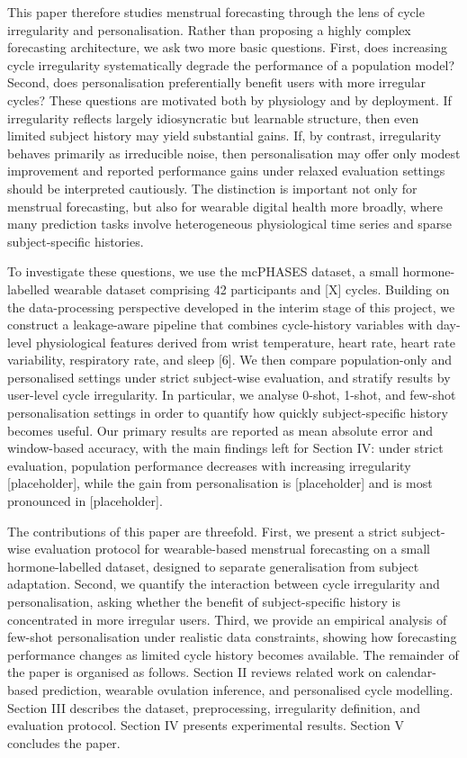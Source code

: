 \documentclass[conference]{IEEEtran}
\begin{document}
This paper therefore studies menstrual forecasting through the lens of cycle irregularity and personalisation. Rather than proposing a highly complex forecasting architecture, we ask two more basic questions. First, does increasing cycle irregularity systematically degrade the performance of a population model? Second, does personalisation preferentially benefit users with more irregular cycles? These questions are motivated both by physiology and by deployment. If irregularity reflects largely idiosyncratic but learnable structure, then even limited subject history may yield substantial gains. If, by contrast, irregularity behaves primarily as irreducible noise, then personalisation may offer only modest improvement and reported performance gains under relaxed evaluation settings should be interpreted cautiously. The distinction is important not only for menstrual forecasting, but also for wearable digital health more broadly, where many prediction tasks involve heterogeneous physiological time series and sparse subject-specific histories.

To investigate these questions, we use the mcPHASES dataset, a small hormone-labelled wearable dataset comprising 42 participants and [X] cycles. Building on the data-processing perspective developed in the interim stage of this project, we construct a leakage-aware pipeline that combines cycle-history variables with day-level physiological features derived from wrist temperature, heart rate, heart rate variability, respiratory rate, and sleep [6]. We then compare population-only and personalised settings under strict subject-wise evaluation, and stratify results by user-level cycle irregularity. In particular, we analyse 0-shot, 1-shot, and few-shot personalisation settings in order to quantify how quickly subject-specific history becomes useful. Our primary results are reported as mean absolute error and window-based accuracy, with the main findings left for Section IV: under strict evaluation, population performance decreases with increasing irregularity [placeholder], while the gain from personalisation is [placeholder] and is most pronounced in [placeholder].

The contributions of this paper are threefold. First, we present a strict subject-wise evaluation protocol for wearable-based menstrual forecasting on a small hormone-labelled dataset, designed to separate generalisation from subject adaptation. Second, we quantify the interaction between cycle irregularity and personalisation, asking whether the benefit of subject-specific history is concentrated in more irregular users. Third, we provide an empirical analysis of few-shot personalisation under realistic data constraints, showing how forecasting performance changes as limited cycle history becomes available. The remainder of the paper is organised as follows. Section II reviews related work on calendar-based prediction, wearable ovulation inference, and personalised cycle modelling. Section III describes the dataset, preprocessing, irregularity definition, and evaluation protocol. Section IV presents experimental results. Section V concludes the paper.
\end{document}
